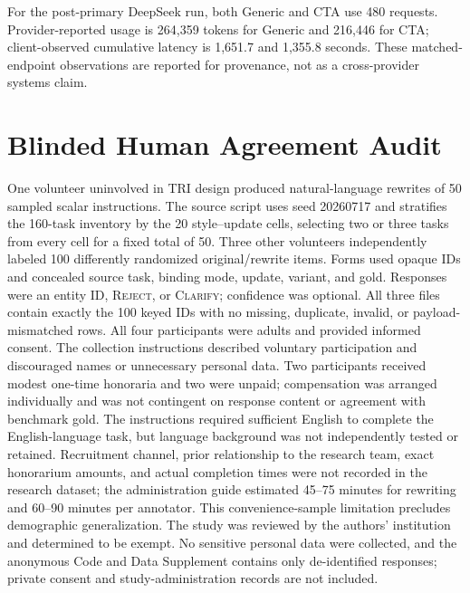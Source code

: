 \documentclass[10pt]{article}
\begin{document}
For the post-primary DeepSeek \NewSchemaReplication{} run, both Generic and CTA use 480 requests. Provider-reported
usage is 264,359 tokens for Generic and 216,446 for CTA; client-observed cumulative latency is
1,651.7 and 1,355.8 seconds. These matched-endpoint observations are reported for provenance,
not as a cross-provider systems claim.

\section{Blinded Human Agreement Audit}
One volunteer uninvolved in TRI design produced natural-language rewrites of 50 sampled scalar
instructions.
The source script uses seed 20260717 and stratifies the 160-task inventory by the 20
style--update cells, selecting two or three tasks from every cell for a fixed total of 50.
Three other volunteers independently labeled 100 differently randomized original/rewrite
items. Forms used opaque IDs and concealed source task, binding mode, update, variant, and
gold. Responses were an entity ID, \textsc{Reject}, or \textsc{Clarify}; confidence was
optional. All three files contain exactly the 100 keyed IDs with no missing, duplicate,
invalid, or payload-mismatched rows.
All four participants were adults and provided informed consent. The collection instructions
described voluntary participation and discouraged names or unnecessary personal data. Two
participants received modest one-time honoraria and two were unpaid; compensation was arranged
individually and was not contingent on response content or agreement with benchmark gold.
The instructions required sufficient English to complete the English-language task, but language
background was not independently tested or retained. Recruitment channel, prior relationship to
the research team, exact honorarium amounts, and actual completion times were not recorded in the
research dataset; the administration guide estimated 45--75 minutes for rewriting and 60--90
minutes per annotator. This convenience-sample limitation precludes demographic generalization.
The study was reviewed by the authors' institution and determined to be exempt. No sensitive
personal data were collected, and the anonymous Code and Data Supplement contains only de-identified
responses; private consent and study-administration records are not included.
\end{document}
